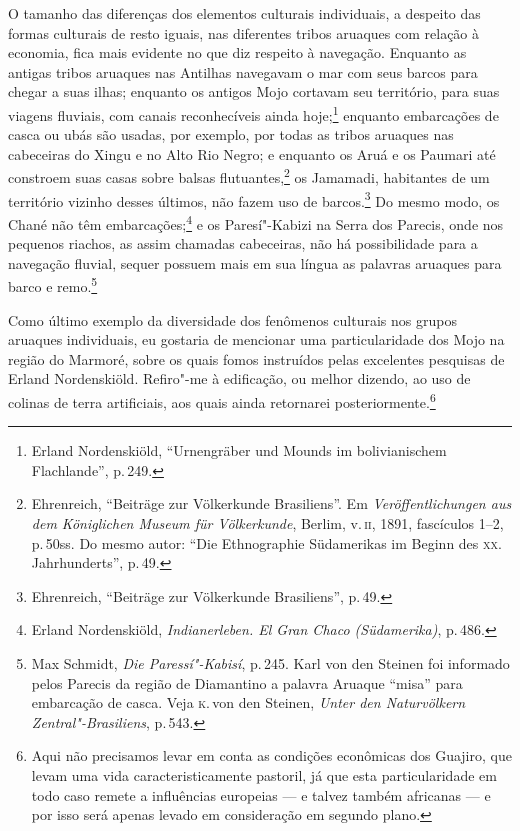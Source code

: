 O tamanho das diferenças dos elementos culturais individuais, a
despeito das formas culturais de resto iguais, nas diferentes tribos
aruaques com relação à economia, fica mais evidente no que diz respeito
à navegação. Enquanto as antigas tribos aruaques nas Antilhas navegavam
o mar com seus barcos para chegar a suas ilhas; enquanto os antigos Mojo
cortavam seu território, para suas viagens fluviais, com canais
reconhecíveis ainda hoje;\footnote{Erland Nordenskiöld, ``Urnengräber
  und Mounds im bolivianischem Flachlande'', p.\,249.} enquanto
embarcações de casca ou ubás são usadas, por exemplo, por todas as
tribos aruaques nas cabeceiras do Xingu e no Alto Rio Negro; e enquanto
os Aruá e os Paumari até constroem suas casas sobre balsas
flutuantes,\footnote{Ehrenreich, ``Beiträge zur Völkerkunde Brasiliens''.
  Em \textit{Veröffentlichungen aus dem Königlichen Museum für
  Völkerkunde}, Berlim, v.\,\textsc{ii}, 1891, fascículos 1--2, p.\,50ss. Do mesmo
  autor: ``Die Ethnographie Südamerikas im Beginn des \textsc{xx}.
  Jahrhunderts'', p.\,49.} os Jamamadi, habitantes de um
território vizinho desses últimos, não fazem uso de barcos.\footnote{Ehrenreich,
  ``Beiträge zur Völkerkunde Brasiliens'', p.\,49.} Do mesmo
modo, os Chané não têm embarcações;\footnote{Erland Nordenskiöld,
  \textit{Indianerleben. El Gran Chaco (Südamerika)}, p.\,486.} e os
Paresí"-Kabizi na Serra dos Parecis, onde nos pequenos riachos, as assim
chamadas cabeceiras, não há possibilidade para a navegação fluvial,
sequer possuem mais em sua língua as palavras aruaques para barco e
remo.\footnote{Max Schmidt, \textit{Die Paressí"-Kabisí}, p.\,245. Karl
  von den Steinen foi informado pelos Parecis da região de Diamantino a
  palavra Aruaque ``misa'' para embarcação de casca. Veja \textsc{k}.\,von den
  Steinen, \textit{Unter den Naturvölkern Zentral"-Brasiliens}, p.\,543.}

Como último exemplo da diversidade dos fenômenos culturais nos grupos
aruaques individuais, eu gostaria de mencionar uma particularidade dos
Mojo na região do Marmoré, sobre os quais fomos instruídos pelas
excelentes pesquisas de Erland Nordenskiöld. Refiro"-me à edificação, ou
melhor dizendo, ao uso de colinas de terra artificiais, aos quais ainda
retornarei posteriormente.\footnote{Aqui não precisamos levar em conta as
condições econômicas dos Guajiro, que levam uma vida
caracteristicamente pastoril, já que esta particularidade em todo caso
remete a influências europeias --- e talvez também africanas --- e por
isso será apenas levado em consideração em segundo plano.}

